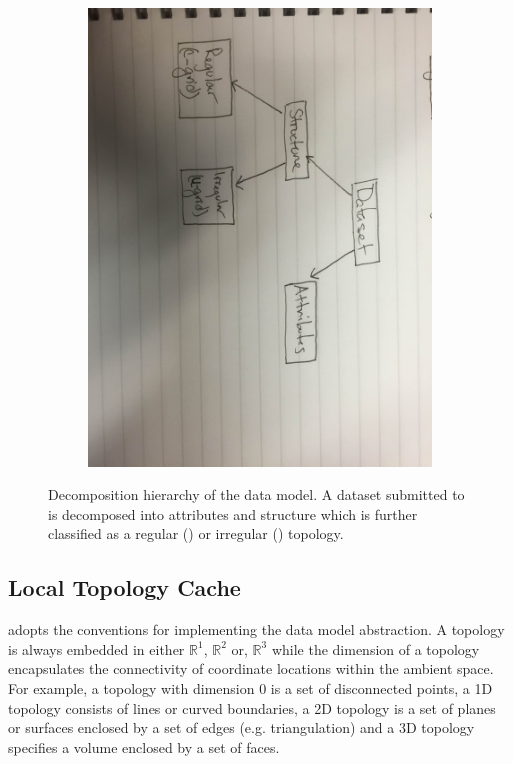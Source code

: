 \begin{figure}[ht!]
  \centering
  \begin{subfigure}[t]{0.45\textwidth}
    \includegraphics[width=\textwidth]{../figs/data_hierarchy_rough}
  \end{subfigure}
  \caption{Decomposition hierarchy of the data model. A dataset submitted
    to \sciwms{} is decomposed into attributes and structure
    which is further classified as a regular (\cgrid{}) or irregular
    (\ugrid{}) topology.}
  \label{fig:data_hierarchy}
\end{figure}

\subsection{Local Topology Cache}

\sciwms{} adopts the \cfugrid{} conventions for implementing the data model abstraction. A topology is always embedded in either $\mathbb{R}^1$,
$\mathbb{R}^2$ or, $\mathbb{R}^3$ while the dimension of a topology
encapsulates the connectivity of coordinate locations within the
ambient space. For example, a topology with dimension 0 is a set of
disconnected points, a 1D topology consists of lines or curved
boundaries, a 2D topology is a set of planes or surfaces enclosed by a
set of edges (e.g. triangulation) and a 3D topology specifies a
volume enclosed by a set of faces.

